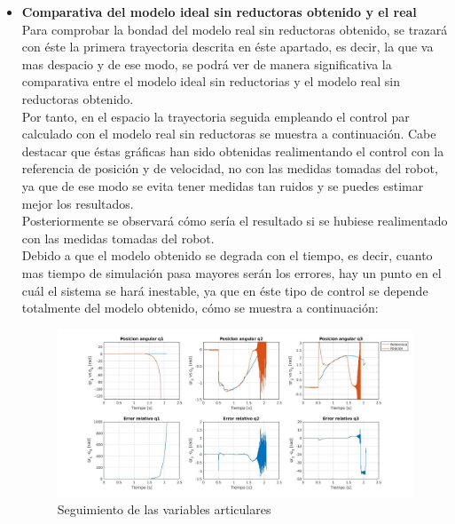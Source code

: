 \begin{itemize}
\newpage
	\item \textbf{Comparativa del modelo ideal sin reductoras obtenido y el real} \\
Para comprobar la bondad del modelo real sin reductoras obtenido, se trazará con éste la primera trayectoria descrita en éste apartado, es decir, la que va mas despacio y de ese modo, se podrá ver de manera significativa la comparativa entre el modelo ideal sin reductorias y el modelo real sin reductoras obtenido. \\
Por tanto, en el espacio la trayectoria seguida empleando el control par calculado con el modelo real sin reductoras se muestra a continuación. Cabe destacar que éstas gráficas han sido obtenidas realimentando el control con la referencia de posición y de velocidad, no con las medidas tomadas del robot, ya que de ese modo se evita tener medidas tan ruidos y se puedes estimar mejor los resultados.\\
Posteriormente se observará cómo sería el resultado si se hubiese realimentado con las medidas tomadas del robot.\\

Debido a que el modelo obtenido se degrada con el tiempo, es decir, cuanto mas tiempo de simulación pasa mayores serán los errores, hay un punto en el cuál el sistema se hará inestable, ya que en éste tipo de control se depende totalmente del modelo obtenido, cómo se muestra a continuación:

\begin{figure}[h!]
	\centering
	\includegraphics[width=.8\textwidth]{exp4_posPDrealSR}
	\caption{Seguimiento de las variables articulares}
\end{figure}

\end{itemize}
